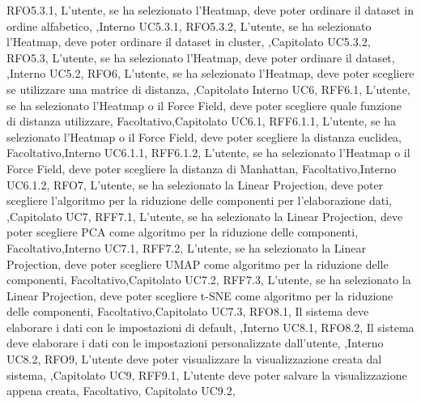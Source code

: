 {    {RFO5.3.1, L'utente{,} se ha selezionato l'Heatmap{,} deve poter ordinare il dataset in ordine alfabetico, \obb,Interno UC5.3.1},
    {RFO5.3.2, L'utente{,} se ha selezionato l'Heatmap{,} deve poter ordinare il dataset in cluster, \obb,Capitolato UC5.3.2},
    {RFO5.3, L'utente{,} se ha selezionato l'Heatmap{,} deve poter ordinare il dataset, \obb,Interno UC5.2},
    {RFO6, L'utente{,} se ha selezionato l'Heatmap{,} deve poter scegliere se utilizzare una matrice di distanza, \obb,Capitolato Interno UC6},
    {RFF6.1, L'utente{,} se ha selezionato l'Heatmap o il Force Field{,} deve poter scegliere quale funzione di distanza utilizzare, Facoltativo,Capitolato UC6.1},
    {RFF6.1.1, L'utente{,} se ha selezionato l'Heatmap o il Force Field{,} deve poter scegliere la distanza euclidea, Facoltativo,Interno UC6.1.1},
    {RFF6.1.2, L'utente{,} se ha selezionato l'Heatmap o il Force Field{,} deve poter scegliere la distanza di Manhattan, Facoltativo,Interno UC6.1.2},
    {RFO7, L'utente{,} se ha selezionato la Linear Projection{,} deve poter scegliere l'algoritmo per la riduzione delle componenti per l'elaborazione dati, \obb,Capitolato UC7},
    {RFF7.1, L'utente{,} se ha selezionato la Linear Projection{,} deve poter scegliere PCA come algoritmo per la riduzione delle componenti, Facoltativo,Interno UC7.1},
    {RFF7.2, L'utente{,} se ha selezionato la Linear Projection{,} deve poter scegliere UMAP come algoritmo per la riduzione delle componenti, Facoltativo,Capitolato UC7.2},
    {RFF7.3, L'utente{,} se ha selezionato la Linear Projection{,} deve poter scegliere t-SNE come algoritmo per la riduzione delle componenti, Facoltativo,Capitolato UC7.3},
    {RFO8.1, Il sistema deve elaborare i dati con le impostazioni di default, \obb,Interno UC8.1},
    {RFO8.2, Il sistema deve elaborare i dati con le impostazioni personalizzate dall'utente, \obb,Interno UC8.2},
    {RFO9, L'utente deve poter visualizzare la visualizzazione creata dal sistema, \obb,Capitolato UC9},
    {RFF9.1, L'utente deve poter salvare la visualizzazione appena creata, Facoltativo, Capitolato UC9.2},
}






